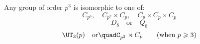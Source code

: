 \begin{mdframed}[align=center,nobreak=true]
    \begin{center}
        Any group of order \(p^3\) is isomorphic to one of:
        \[%
            C_{p^3}, \quad%
            C_{p^2} \times C_p, \quad%
            C_p \times C_p \times C_p
        \]
        \[
            D_8 \quad \text{or} \quad%
            Q_8 \tag{when \(p = 2\)}
        \]
        \[
            \UT_3(p) \quad \text{or} \quad%
            C_{p^2} \rtimes C_p \tag{when \(p \geqslant 3\)}
        \]
    \end{center}
\end{mdframed}
